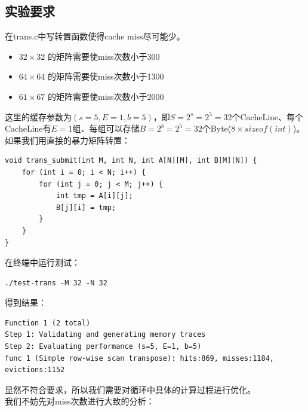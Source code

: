 \documentclass[12pt, a4paper, oneside]{ctexart}
\begin{document}
\subsection{实验要求}
\noindent
在trans.c中写转置函数使得cache miss尽可能少。
\begin{itemize}
    \item $32 \times 32$ 的矩阵需要使miss次数小于300
    \item $64 \times 64$ 的矩阵需要使miss次数小于1300
    \item $61 \times 67$ 的矩阵需要使miss次数小于2000
\end{itemize}
这里的缓存参数为$(s = 5, E = 1, b = 5)$，即$S = 2^s = 2^5 = 32$个CacheLine、每个CacheLine有$E=1$组、每组可以存储$B = 2^b = 2^5 = 32$个Byte($8 \times sizeof(int)$)。\\
如果我们用直接的暴力矩阵转置：
\begin{lstlisting}
void trans_submit(int M, int N, int A[N][M], int B[M][N]) {
    for (int i = 0; i < N; i++) {
        for (int j = 0; j < M; j++) {
            int tmp = A[i][j];
            B[j][i] = tmp;
        }
    }
}
\end{lstlisting}
在终端中运行测试：
\begin{lstlisting}
./test-trans -M 32 -N 32
\end{lstlisting}
得到结果：
\begin{lstlisting}
Function 1 (2 total)
Step 1: Validating and generating memory traces
Step 2: Evaluating performance (s=5, E=1, b=5)
func 1 (Simple row-wise scan transpose): hits:869, misses:1184, evictions:1152
\end{lstlisting}
显然不符合要求，所以我们需要对循环中具体的计算过程进行优化。\\
我们不妨先对miss次数进行大致的分析：\\
\end{document}
